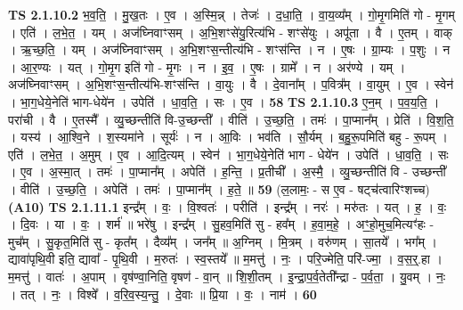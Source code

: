 \documentclass[17pt]{extarticle}
\begin{document}
                  \newline
                                \textbf{ TS 2.1.10.2} \newline
                  भ॒व॒ति॒ । मु॒ख॒तः । ए॒व । अ॒स्मि॒न्न् । तेजः॑ । द॒धा॒ति॒ । वा॒य॒व्य᳚म् । गो॒मृ॒गमिति॑ गो - मृ॒गम् । एति॑ । ल॒भे॒त॒ । यम् । अज॑घ्निवाꣳसम् । अ॒भि॒शꣳसे॑यु॒रित्य॑भि - शꣳसे॑युः । अपू॑ता । वै । ए॒तम् । वाक् । ऋ॒च्छ॒ति॒ । यम् । अज॑घ्निवाꣳसम् । अ॒भि॒शꣳस॒न्तीत्य॑भि - शꣳस॑न्ति । न । ए॒षः । ग्रा॒म्यः । प॒शुः । न । आ॒र॒ण्यः । यत् । गो॒मृ॒ग इति॑ गो - मृ॒गः । न । इ॒व॒ । ए॒षः । ग्रामे᳚ । न । अर॑ण्ये । यम् । अज॑घ्निवाꣳसम् । अ॒भि॒शꣳस॒न्तीत्य॑भि-शꣳस॑न्ति । वा॒युः । वै । दे॒वाना᳚म् । प॒वित्र᳚म् । वा॒युम् । ए॒व । स्वेन॑ । भा॒ग॒धेये॒नेति॑ भाग-धेये॑न । उपेति॑ । धा॒व॒ति॒ । सः । ए॒व । \textbf{  58} \newline
                  \newline
                                \textbf{ TS 2.1.10.3} \newline
                  ए॒न॒म् । प॒व॒य॒ति॒ । परा॑ची । वै । ए॒तस्मै᳚ । व्यु॒च्छन्तीति॑ वि-उ॒च्छन्ती᳚ । वीति॑ । उ॒च्छ॒ति॒ । तमः॑ । पा॒प्मान᳚म् । प्रेति॑ । वि॒श॒ति॒ । यस्य॑ । आ॒श्वि॒ने । श॒स्यमा॑ने । सूर्यः॑ । न । आ॒विः । भव॑ति । सौ॒र्यम् । ब॒हु॒रू॒पमिति॑ बहु - रू॒पम् । एति॑ । ल॒भे॒त॒ । अ॒मुम् । ए॒व । आ॒दि॒त्यम् । स्वेन॑ । भा॒ग॒धेये॒नेति॑ भाग - धेये॑न । उपेति॑ । धा॒व॒ति॒ । सः । ए॒व । अ॒स्मा॒त् । तमः॑ । पा॒प्मान᳚म् । अपेति॑ । ह॒न्ति॒ । प्र॒तीची᳚ । अ॒स्मै॒ । व्यु॒च्छन्तीति॑ वि - उच्छन्ती᳚ । वीति॑ । उ॒च्छ॒ति॒ । अपेति॑ । तमः॑ । पा॒प्मान᳚म् । ह॒ते॒ ॥ \textbf{  59} \newline
                  \newline
                      (ल॒लामः॒ - स ए॒व - षट्च॑त्वारिꣳशच्च)  \textbf{(A10)} \newline \newline
                                \textbf{ TS 2.1.11.1} \newline
                  इन्द्र᳚म् । वः॒ । वि॒श्वतः॑ । परीति॑ । इन्द्र᳚म् । नरः॑ । मरु॑तः । यत् । ह॒ । वः॒ । दि॒वः । या । वः॒ । शर्म॑ ॥ भरे॑षु । इन्द्र᳚म् । सु॒हव॒मिति॑ सु - हव᳚म् । ह॒वा॒म॒हे॒ । अꣳ॒॒हो॒मुच॒मित्यꣳ॑हः - मुच᳚म् । सु॒कृत॒मिति॑ सु - कृत᳚म् । दैव्य᳚म् । जन᳚म् ॥ अ॒ग्निम् । मि॒त्रम् । वरु॑णम् । सा॒तये᳚ । भग᳚म् । द्यावा॑पृथि॒वी इति॒ द्यावा᳚ - पृ॒थि॒वी । म॒रुतः॑ । स्व॒स्तये᳚ ॥ म॒मत्तु॑ । नः॒ । परि॒ज्मेति॒ परि॑-ज्मा॒ । व॒स॒र्॒.हा । म॒मत्तु॑ । वातः॑ । अ॒पाम् । वृष॑ण्वा॒निति॒ वृषण॑ - वा॒न् ॥ शि॒शी॒तम् । इ॒न्द्रा॒प॒र्व॒तेती᳚न्द्रा - प॒र्व॒ता॒ । यु॒वम् । नः॒ । तत् । नः॒ । विश्वे᳚ । व॒रि॒व॒स्य॒न्तु॒ । दे॒वाः ॥ प्रि॒या । वः॒ । नाम॑ । \textbf{  60} \newline
\end{document}
